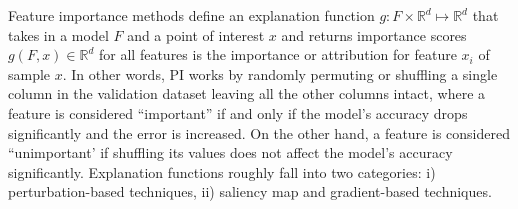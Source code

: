 \hspace*{3.5mm} Feature importance methods define an explanation function $g: F \times \mathbb{R}^{d} \mapsto \mathbb{R}^{d}$ that takes in a model $F$ and a point of interest $x$ and returns importance scores $g(F,x) \in \mathbb{R}^{d}$ for all features is the importance or attribution for feature $x_i$ of sample $x$. In other words, PI works by randomly permuting or shuffling a single column in the validation dataset leaving all the other columns intact, where a feature is considered ``important” if and only if the model's accuracy drops significantly and the error is increased. On the other hand, a feature is considered ``unimportant’ if shuffling its values does not affect the model's accuracy significantly. Explanation functions roughly fall into two categories: i) perturbation-based techniques, ii) saliency map and gradient-based techniques. 

